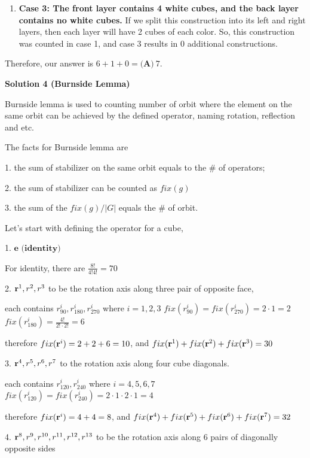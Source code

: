 \begin{enumerate}
\begin{enumerate}
        \item \textbf{Case 3: The front layer contains 4 white cubes, and the back layer contains no white cubes.} If we split this construction into its left and right layers, then each layer will have 2 cubes of each color. So, this construction was counted in case 1, and case 3 results in $0$ additional constructions.
            \end{enumerate}
            Therefore, our answer is $6+1+0=\boxed{\textbf{(A)}\ 7}$.

 



\textbf{Solution 4 (Burnside Lemma)}

Burnside lemma is used to counting number of orbit where the element on the same orbit can be achieved by the defined operator, naming rotation, reflection and etc. 

 The facts for Burnside lemma are 

 1. the sum of stabilizer on the same orbit equals to the \# of operators; 

 2. the sum of stabilizer can be counted as $fix(g)$ 

 3. the sum of the $fix(g)/|G|$ equals the \# of orbit. 

 
Let's start with defining the operator for a cube, 

 1. $\textbf{e (identity)}$

 For identity, there are $\frac{8!}{4!4!} = 70$ 

 
2. ${\textbf r^{1}, r^{2}, r^{3}}$ to be the rotation axis along three pair of opposite face, 

 each contains $r^{i}_{90}, r^{i}_{180}, r^{i}_{270}$ where $i= 1, 2, 3$
$fix(r^{i}_{90}) = fix(r^{i}_{270}) = 2\cdot1 = 2$
$fix(r^{i}_{180}) = \frac{4!}{2!\cdot2!} = 6$

 therefore $fix(\textbf r^{i}) = 2+2+6 = 10$, and $fix(\textbf r^{1})+fix(\textbf r^{2})+fix(\textbf r^{3}) = 30$

 
3. ${\textbf r^{4}, r^{5}, r^{6}, r^{7}}$ to the rotation axis along four cube diagonals. 

 each contains $r^{i}_{120}, r^{i}_{240}$   where $i= 4, 5, 6, 7$
$fix(r^{i}_{120}) = fix(r^{i}_{240}) = 2\cdot1\cdot2\cdot1 = 4$

 therefore $fix(\textbf r^{i}) = 4+4 = 8$, and $fix(\textbf r^{4})+fix(\textbf r^{5})+fix(\textbf r^{6})+fix(\textbf r^{7}) = 32$

 


 4. ${\textbf r^{8}, r^{9}, r^{10}, r^{11}, r^{12}, r^{13}}$ to be the rotation axis along 6 pairs of diagonally opposite sides


\end{enumerate}
